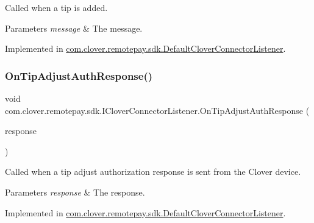 Called when a tip is added. 


\begin{DoxyParams}{Parameters}
{\em message} & The message.\\
\hline
\end{DoxyParams}


Implemented in \hyperlink{classcom_1_1clover_1_1remotepay_1_1sdk_1_1_default_clover_connector_listener_a8d3f850e69a03e0ef259f992a4865b52}{com.\+clover.\+remotepay.\+sdk.\+Default\+Clover\+Connector\+Listener}.

\mbox{\label{interfacecom_1_1clover_1_1remotepay_1_1sdk_1_1_i_clover_connector_listener_af972cda237b66fcd297117ae195537b7}} 
\subsubsection{\texorpdfstring{On\+Tip\+Adjust\+Auth\+Response()}{OnTipAdjustAuthResponse()}}
{\footnotesize\ttfamily void com.\+clover.\+remotepay.\+sdk.\+I\+Clover\+Connector\+Listener.\+On\+Tip\+Adjust\+Auth\+Response (\begin{DoxyParamCaption}\item[{\hyperlink{classcom_1_1clover_1_1remotepay_1_1sdk_1_1_tip_adjust_auth_response}{Tip\+Adjust\+Auth\+Response}}]{response }\end{DoxyParamCaption})}



Called when a tip adjust authorization response is sent from the Clover device. 


\begin{DoxyParams}{Parameters}
{\em response} & The response.\\
\hline
\end{DoxyParams}


Implemented in \hyperlink{classcom_1_1clover_1_1remotepay_1_1sdk_1_1_default_clover_connector_listener_ab81030d438c6c75eb2a2b8ee3fd6f51f}{com.\+clover.\+remotepay.\+sdk.\+Default\+Clover\+Connector\+Listener}.

